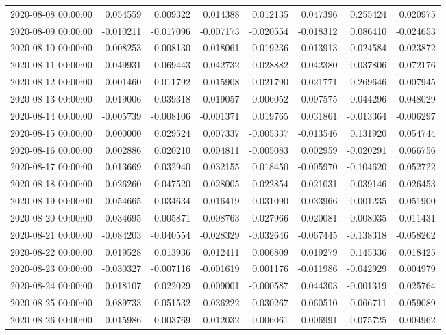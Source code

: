\begin{tabular}{lrrrrrrr}
2020-08-08 00:00:00 & 0.054559 & 0.009322 & 0.014388 & 0.012135 & 0.047396 & 0.255424 & 0.020975 \\
2020-08-09 00:00:00 & -0.010211 & -0.017096 & -0.007173 & -0.020554 & -0.018312 & 0.086410 & -0.024653 \\
2020-08-10 00:00:00 & -0.008253 & 0.008130 & 0.018061 & 0.019236 & 0.013913 & -0.024584 & 0.023872 \\
2020-08-11 00:00:00 & -0.049931 & -0.069443 & -0.042732 & -0.028882 & -0.042380 & -0.037806 & -0.072176 \\
2020-08-12 00:00:00 & -0.001460 & 0.011792 & 0.015908 & 0.021790 & 0.021771 & 0.269646 & 0.007945 \\
2020-08-13 00:00:00 & 0.019006 & 0.039318 & 0.019057 & 0.006052 & 0.097575 & 0.044296 & 0.048029 \\
2020-08-14 00:00:00 & -0.005739 & -0.008106 & -0.001371 & 0.019765 & 0.031861 & -0.013364 & -0.006297 \\
2020-08-15 00:00:00 & 0.000000 & 0.029524 & 0.007337 & -0.005337 & -0.013546 & 0.131920 & 0.054744 \\
2020-08-16 00:00:00 & 0.002886 & 0.020210 & 0.004811 & -0.005083 & 0.002959 & -0.020291 & 0.066756 \\
2020-08-17 00:00:00 & 0.013669 & 0.032940 & 0.032155 & 0.018450 & -0.005970 & -0.104620 & 0.052722 \\
2020-08-18 00:00:00 & -0.026260 & -0.047520 & -0.028005 & -0.022854 & -0.021031 & -0.039146 & -0.026453 \\
2020-08-19 00:00:00 & -0.054665 & -0.034634 & -0.016419 & -0.031090 & -0.033966 & -0.001235 & -0.051900 \\
2020-08-20 00:00:00 & 0.034695 & 0.005871 & 0.008763 & 0.027966 & 0.020081 & -0.008035 & 0.011431 \\
2020-08-21 00:00:00 & -0.084203 & -0.040554 & -0.028329 & -0.032646 & -0.067445 & -0.138318 & -0.058262 \\
2020-08-22 00:00:00 & 0.019528 & 0.013936 & 0.012411 & 0.006809 & 0.019279 & 0.145336 & 0.018425 \\
2020-08-23 00:00:00 & -0.030327 & -0.007116 & -0.001619 & 0.001176 & -0.011986 & -0.042929 & 0.004979 \\
2020-08-24 00:00:00 & 0.018107 & 0.022029 & 0.009001 & -0.000587 & 0.044303 & -0.001319 & 0.025764 \\
2020-08-25 00:00:00 & -0.089733 & -0.051532 & -0.036222 & -0.030267 & -0.060510 & -0.066711 & -0.059089 \\
2020-08-26 00:00:00 & 0.015986 & -0.003769 & 0.012032 & -0.006061 & 0.006991 & 0.075725 & -0.004962 \\

\end{tabular}
